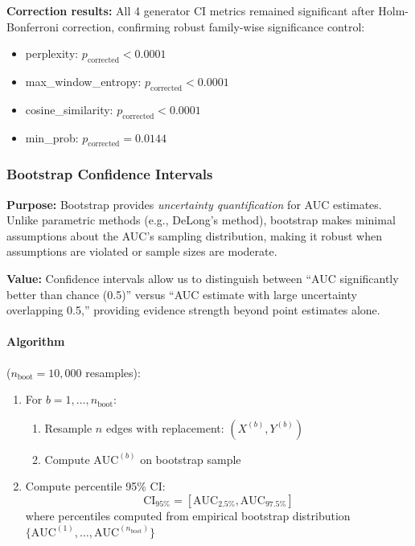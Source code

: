 \textbf{Correction results:} All 4 generator CI metrics remained significant after Holm-Bonferroni correction, confirming robust family-wise significance control:
\begin{itemize}
    \item perplexity: \(p_{\text{corrected}} < 0.0001\)
    \item max\_window\_entropy: \(p_{\text{corrected}} < 0.0001\)
    \item cosine\_similarity: \(p_{\text{corrected}} < 0.0001\)
    \item min\_prob: \(p_{\text{corrected}} = 0.0144\)
\end{itemize}

\subsubsection{Bootstrap Confidence Intervals}

\textbf{Purpose:} Bootstrap provides \textit{uncertainty quantification} for AUC estimates. Unlike parametric methods (e.g., DeLong's method), bootstrap makes minimal assumptions about the AUC's sampling distribution, making it robust when assumptions are violated or sample sizes are moderate.

\textbf{Value:} Confidence intervals allow us to distinguish between ``AUC significantly better than chance (0.5)'' versus ``AUC estimate with large uncertainty overlapping 0.5,'' providing evidence strength beyond point estimates alone.

\paragraph{Algorithm} (\(n_{\text{boot}} = 10{,}000\) resamples):
\begin{enumerate}
    \item For \(b = 1, \ldots, n_{\text{boot}}\):
    \begin{enumerate}
        \item Resample \(n\) edges with replacement: \((X^{(b)}, Y^{(b)})\)
        \item Compute \(\text{AUC}^{(b)}\) on bootstrap sample
    \end{enumerate}
    \item Compute percentile 95\% CI:
    \[
    \text{CI}_{95\%} = [\text{AUC}_{2.5\%}, \text{AUC}_{97.5\%}]
    \]
    where percentiles computed from empirical bootstrap distribution \(\{\text{AUC}^{(1)}, \ldots, \text{AUC}^{(n_{\text{boot}})}\}\)
\end{enumerate}

